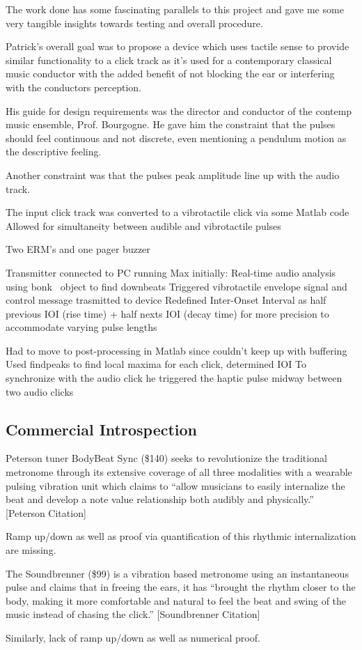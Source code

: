 The work done has some fascinating parallels to this project and gave me some very tangible insights towards testing and overall procedure.

Patrick’s overall goal was to propose a device which uses tactile sense to provide similar functionality to a click track as it’s used for a contemporary classical music conductor with the added benefit of not blocking the ear or interfering with the conductors perception.

His guide for design requirements was the director and conductor of the contemp music ensemble, Prof. Bourgogne. He gave him the constraint that the pulses should feel continuous and not discrete, even mentioning a pendulum motion as the descriptive feeling. 

Another constraint was that the pulses peak amplitude line up with the audio track.

The input click track was converted to a vibrotactile click via some Matlab code
	Allowed for simultaneity between audible and vibrotactile pulses

Two ERM’s and one pager buzzer

Transmitter connected to PC running Max initially:
Real-time audio analysis using bonk~ object to find downbeats
Triggered vibrotactile envelope signal and control message trasmitted to device
	Redefined Inter-Onset Interval as half previous IOI (rise time) + half nexts IOI (decay time) for more precision to accommodate varying pulse lengths

Had to move to post-processing in Matlab since couldn’t keep up with buffering
Used findpeaks to find local maxima for each click, determined IOI
To synchronize with the audio click he triggered the haptic pulse midway between two audio clicks


\subsection{Commercial Introspection}
Peterson tuner BodyBeat Sync (\$140) seeks to revolutionize the traditional metronome through its extensive coverage of all three modalities with a wearable pulsing vibration unit which claims to “allow musicians to easily internalize the beat and develop a note value relationship both audibly and physically.” [Peterson Citation]

Ramp up/down as well as proof via quantification of this rhythmic internalization are missing.

The Soundbrenner (\$99) is a vibration based metronome using an instantaneous pulse and claims that in freeing the ears, it has “brought the rhythm closer to the body, making it more comfortable and natural to feel the beat and swing of the music instead of chasing the click.” [Soundbrenner Citation]

Similarly, lack of ramp up/down as well as numerical proof.

